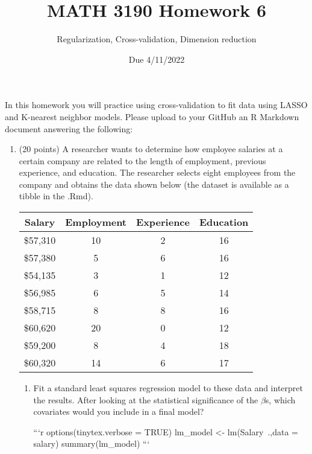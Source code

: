 \documentclass[
]{article}
\title{MATH 3190 Homework 6}
\author{Regularization, Cross-validation, Dimension reduction}
\date{Due 4/11/2022}
\begin{document}
\maketitle

In this homework you will practice using cross-validation to fit data
using LASSO and K-nearest neighbor models. Please upload to your GitHub
an R Markdown document answering the following:

\begin{enumerate}
\item (20 points) A researcher wants to determine how employee salaries at a certain company are related to the length of employment, previous experience, and education. The researcher selects eight employees from the company and obtains the data shown below (the dataset is available as a tibble in the .Rmd). 

\begin{center}            
\begin{tabular}{|cccc|}\hline
Salary      & Employment        & Experience        & Education\\\hline
\$57,310       & 10                & 2                 & 16 \\
\$57,380       & 5                 & 6                 & 16 \\
\$54,135       & 3                 & 1                 & 12 \\
\$56,985       & 6                 & 5                 & 14 \\
\$58,715       & 8                 & 8                 & 16 \\
\$60,620       & 20                & 0                 & 12 \\
\$59,200       & 8                 & 4                 & 18 \\
\$60,320       & 14                & 6                 & 17 \\\hline
\end{tabular}
\end{center}            


    \begin{enumerate}
    \item Fit a standard least squares regression model to these data and interpret the results. After looking at the statistical significance of the $\beta$s, which covariates would you include in a final model? 

```r
  options(tinytex.verbose = TRUE)
  lm_model <- lm(Salary~.,data = salary)
  summary(lm_model)
```


\end{enumerate}
\end{enumerate}
\end{document}
